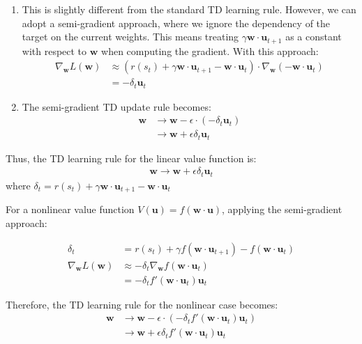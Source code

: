 \documentclass{article}
\begin{document}
\begin{enumerate}
    \item This is slightly different from the standard TD learning rule. However, we can adopt a semi-gradient approach, where we ignore the dependency of the target on the current weights. This means treating $\gamma \mathbf{w} \cdot \mathbf{u}_{t+1}$ as a constant with respect to $\mathbf{w}$ when computing the gradient. With this approach:
    \begin{align}
        \nabla_\mathbf{w} L(\mathbf{w}) &\approx (r(s_t) + \gamma \mathbf{w} \cdot \mathbf{u}_{t+1} - \mathbf{w} \cdot \mathbf{u}_t) \cdot \nabla_\mathbf{w}(- \mathbf{w} \cdot \mathbf{u}_t) \\
        &= -\delta_t \mathbf{u}_t
    \end{align}
    
    \item The semi-gradient TD update rule becomes:
    \begin{align}
        \mathbf{w} &\rightarrow \mathbf{w} - \epsilon \cdot (-\delta_t \mathbf{u}_t) \\
        &\rightarrow \mathbf{w} + \epsilon \delta_t \mathbf{u}_t
    \end{align}
\end{enumerate}

Thus, the TD learning rule for the linear value function is:
\begin{align}
    \mathbf{w} \rightarrow \mathbf{w} + \epsilon \delta_t \mathbf{u}_t
\end{align}
where $\delta_t = r(s_t) + \gamma \mathbf{w} \cdot \mathbf{u}_{t+1} - \mathbf{w} \cdot \mathbf{u}_t$

For a nonlinear value function $V(\mathbf{u}) = f(\mathbf{w} \cdot \mathbf{u})$, applying the semi-gradient approach:

\begin{align}
    \delta_t &= r(s_t) + \gamma f(\mathbf{w} \cdot \mathbf{u}_{t+1}) - f(\mathbf{w} \cdot \mathbf{u}_t) \\
    \nabla_\mathbf{w} L(\mathbf{w}) &\approx -\delta_t \nabla_\mathbf{w} f(\mathbf{w} \cdot \mathbf{u}_t) \\
    &= -\delta_t f'(\mathbf{w} \cdot \mathbf{u}_t) \mathbf{u}_t
\end{align}

Therefore, the TD learning rule for the nonlinear case becomes:
\begin{align}
    \mathbf{w} &\rightarrow \mathbf{w} - \epsilon \cdot (-\delta_t f'(\mathbf{w} \cdot \mathbf{u}_t) \mathbf{u}_t) \\
    &\rightarrow \mathbf{w} + \epsilon \delta_t f'(\mathbf{w} \cdot \mathbf{u}_t) \mathbf{u}_t
\end{align}
\end{document}
